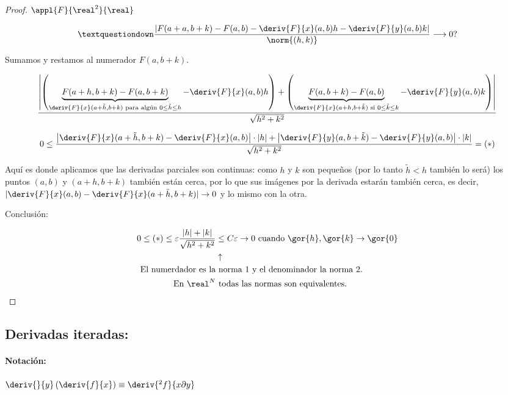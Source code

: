 \begin{proof}
 $\appl{F}{\real^2}{\real}$
 
 $$¿\frac{\left|F(a+a,b+k) - F(a,b) - \deriv{F}{x}(a,b) h - \deriv{F}{y}(a,b)k\right|}{\norm{(h,k)}}\longrightarrow 0?$$
 
 Sumamos y restamos al numerador $F(a,b+k)$.
 
 $$\frac{\left|\left(\underbrace{F(a+h,b+k) - F(a,b+k)}_{\deriv{F}{x}(a+\tilde{h},b+k) \text{ para algún } 0 \leq\tilde{h}\leq h} -  \deriv{F}{x}(a,b) h\right) + \left(\underbrace{F(a,b+k) - F(a,b)}_{\deriv{F}{x}(a+h,b+\tilde{k}) \text{ si } 0 \leq\tilde{k}\leq k}- \deriv{F}{y}(a,b) k\right)\right|}{\sqrt{h^2+k^2}}$$

 $$0\leq\frac{\left|\deriv{F}{x}(a+\tilde{h},b+k)-\deriv{F}{x}(a,b)\right| \cdot |h| + \left| \deriv{F}{y}(a,b+\tilde{k}) - \deriv{F}{y}(a,b)\right| \cdot |k|}{\sqrt{h^2+k^2}} = (*)$$
 
 Aquí es donde aplicamos que las derivadas parciales son continuas: como $h$ y $k$ son pequeños (por lo tanto $\tilde{h}<h$ también lo será) los puntos $(a,b)$ y $(a+h,b+k)$ también están cerca, por lo que sus imágenes por la derivada estarán también cerca, es decir, $|\deriv{F}{x}(a,b)-\deriv{F}{x}(a+\tilde{h},b+k)| \rightarrow 0$ y lo mismo con la otra.
 
 Conclusión:
 
 \begin{align*}
0 \leq (*) \leq \varepsilon \frac{|h|+|k|}{\sqrt{h^2+k^2}} &\leq C\varepsilon \rightarrow 0 \text{ cuando } \gor{h},\gor{k} \rightarrow \gor{0}\\
&\uparrow\\
\text{El numerdador es la} & \text{ norma 1 y el denominador la norma 2.}\\
\text{En } \real^N &\text{ todas las normas son equivalentes.}  
 \end{align*}
 
 
\end{proof}


\subsection{Derivadas iteradas:}

\paragraph{Notación:}

$\deriv{}{y}\left(\deriv{f}{x}\right) \equiv \deriv{^2f}{x \partial y}$

